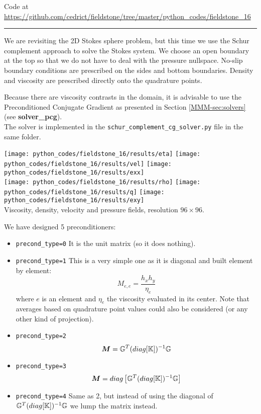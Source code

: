 

\begin{center}
Code at \url{https://github.com/cedrict/fieldstone/tree/master/python_codes/fieldstone_16}
\end{center}

\par\noindent\rule{\textwidth}{0.4pt}


We are revisiting the 2D Stokes sphere problem, but this time 
we use the Schur complement approach to solve the Stokes system. 
We choose an open boundary at the top so that we do not have to deal with the pressure 
nullspace. No-slip boundary conditions are prescribed on the sides and bottom boundaries.
Density and viscosity are prescribed directly onto the quadrature points. 

Because there are viscosity contrasts in the domain, it is advisable 
to use the Preconditioned Conjugate Gradient 
as presented in Section \ref{MMM-sec:solvers} (see {\bf solver\_pcg}).\\
The solver is implemented in the {\tt schur\_complement\_cg\_solver.py} file in the same folder.  

\begin{center} 
\texttt{[image: python\_codes/fieldstone\_16/results/eta]}
\texttt{[image: python\_codes/fieldstone\_16/results/vel]}
\texttt{[image: python\_codes/fieldstone\_16/results/exx]}\\
\texttt{[image: python\_codes/fieldstone\_16/results/rho]}
\texttt{[image: python\_codes/fieldstone\_16/results/q]}
\texttt{[image: python\_codes/fieldstone\_16/results/exy]}\\
{\captionfont Viscosity, density, velocity and pressure fields, resolution $96\times 96$.}
\end{center} 

We have designed 5 preconditioners:
\begin{itemize}
\item {\tt precond\_type=0} It is the unit matrix (so it does nothing). 
\item {\tt precond\_type=1} This is a very simple one as it is
diagonal and built element by element:
\[
M_{e,e} = \frac{h_x h_y}{\eta_e} 
\]
where $e$ is an element and $\eta_e$ the viscosity evaluated in its center. Note that 
averages based on quadrature point values could also be considered (or any other kind of projection).
\item {\tt precond\_type=2}
\[
{\bm M} = {\mathbb{G}}^T (diag [{\mathbb{K}}]  )^{-1} {\mathbb{G}} 
\]
\item {\tt precond\_type=3} 
\[
{\bm M} = diag \left[ {\mathbb{G}}^T (diag [{\mathbb{K}}]  )^{-1} {\mathbb{G}} \right]
\]
\item {\tt precond\_type=4} Same as 2, but instead of using the 
diagonal of $ {\mathbb{G}}^T (diag [{\mathbb{K}}]  )^{-1} {\mathbb{G}}$ we lump the matrix instead.

\end{itemize}


